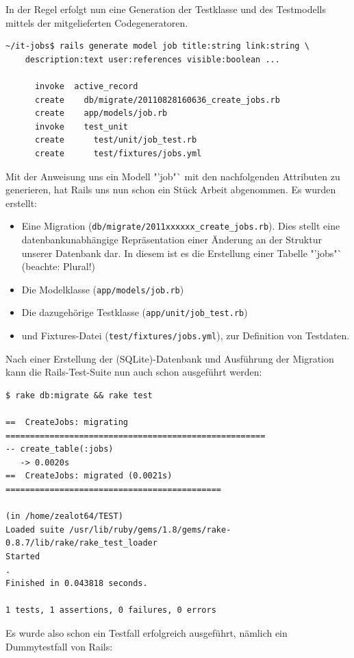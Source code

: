In der Regel erfolgt nun eine Generation der Testklasse und des Testmodells mittels der mitgelieferten Codegeneratoren. 
\begin{lstlisting}
~/it-jobs$ rails generate model job title:string link:string \
    description:text user:references visible:boolean ...

      invoke  active_record
      create    db/migrate/20110828160636_create_jobs.rb
      create    app/models/job.rb
      invoke    test_unit
      create      test/unit/job_test.rb
      create      test/fixtures/jobs.yml

\end{lstlisting}
Mit der Anweisung uns ein Modell "'job"` mit den nachfolgenden Attributen zu generieren, hat Rails uns nun schon ein Stück Arbeit abgenommen. Es wurden erstellt:
\begin{itemize}
 \item Eine Migration (\verb|db/migrate/2011xxxxxx_create_jobs.rb|). Dies stellt eine datenbankunabhängige Repräsentation einer Änderung an der Struktur unserer Datenbank dar. In diesem ist es die Erstellung einer Tabelle "'jobs"` (beachte: Plural!)
 \item Die Modelklasse (\verb|app/models/job.rb|)
 \item Die dazugehörige Testklasse (\verb|app/unit/job_test.rb|)
 \item und Fixtures-Datei (\verb|test/fixtures/jobs.yml|), zur Definition von Testdaten. 
\end{itemize}


Nach einer Erstellung der (SQLite)-Datenbank und Ausführung der Migration kann die Rails-Test-Suite nun auch schon ausgeführt werden:

\begin{lstlisting}
$ rake db:migrate && rake test
 
==  CreateJobs: migrating =====================================================
-- create_table(:jobs)
   -> 0.0020s
==  CreateJobs: migrated (0.0021s) ============================================

(in /home/zealot64/TEST)
Loaded suite /usr/lib/ruby/gems/1.8/gems/rake-0.8.7/lib/rake/rake_test_loader
Started
.
Finished in 0.043818 seconds.

1 tests, 1 assertions, 0 failures, 0 errors

\end{lstlisting}

Es wurde also schon ein Testfall erfolgreich ausgeführt, nämlich ein Dummytestfall von Rails:

